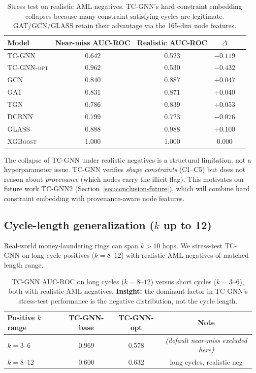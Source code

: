\documentclass[journal,onecolumn]{IEEEtran}
\begin{document}
\begin{table}[t]
\centering
\caption{Stress test on realistic AML negatives. TC-GNN's hard
constraint embedding collapses because many constraint-satisfying
cycles are legitimate. GAT/GCN/GLASS retain their advantage via the
165-dim node features.}
\label{tab:realistic}
\small
\begin{tabular}{lcccc}
\toprule
\textbf{Model} & \textbf{Near-miss AUC-ROC} & \textbf{Realistic AUC-ROC} & $\Delta$ \\
\midrule
\textsc{TC-GNN}      & 0.642 & 0.523 & $-0.119$ \\
\textsc{TC-GNN-opt} & 0.962 & 0.530 & $-0.432$ \\
\textsc{GCN}         & 0.840 & 0.887 & $+0.047$ \\
\textsc{GAT}         & 0.831 & 0.871 & $+0.040$ \\
\textsc{TGN}         & 0.786 & 0.839 & $+0.053$ \\
\textsc{DCRNN}       & 0.799 & 0.723 & $-0.076$ \\
\textsc{GLASS}       & 0.888 & 0.988 & $+0.100$ \\
\textsc{XGBoost}     & 1.000 & 1.000 &  $0.000$ \\
\bottomrule
\end{tabular}
\end{table}

The collapse of TC-GNN under realistic negatives is a structural
limitation, not a hyperparameter issue. TC-GNN verifies \emph{shape
constraints} (C1--C5) but does not reason about \emph{provenance} (which
nodes carry the illicit flag). This motivates our future work
\textsc{TC-GNN}2 (Section~\ref{sec:conclusion-future}), which will
combine hard constraint embedding with provenance-aware node features.

\subsection{Cycle-length generalization ($k$ up to 12)}
\label{sec:exp-length}

Real-world money-laundering rings can span $k > 10$ hops. We
stress-test TC-GNN on long-cycle positives ($k = 8$--$12$) with
realistic-AML negatives of matched length range.

\begin{table}[t]
\centering
\caption{TC-GNN AUC-ROC on long cycles ($k = 8$--$12$)
versus short cycles ($k = 3$--$6$), both with realistic-AML negatives.
\textbf{Insight:} the dominant factor in TC-GNN's stress-test
performance is the negative distribution, not the cycle length.}
\label{tab:length}
\small
\begin{tabular}{lccc}
\toprule
\textbf{Positive $k$ range} & \textbf{TC-GNN-base} & \textbf{TC-GNN-opt} & \textbf{Note} \\
\midrule
$k = 3$--$6$ & 0.969 & 0.578 & \emph{(default near-miss excluded here)} \\
$k = 8$--$12$ & 0.600 & 0.632 & long cycles, realistic neg \\
\bottomrule
\end{tabular}
\end{table}
\end{document}
